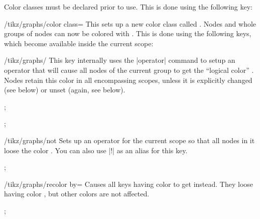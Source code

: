 Color classes must be declared prior to use. This is done using the following
key:
%
\begin{key}{/tikz/graphs/color class=}
    This sets up a new color class called . Nodes and
    whole groups of nodes can now be colored with . This
    is done using the following keys, which become
    available inside the current scope:
    \begin{key}{/tikz/graphs/}
        This key internally uses the |operator| command to setup an operator
        that will cause all nodes of the current group to get the ``logical
        color'' . Nodes retain this color in all
        encompassing scopes, unless it is explicitly changed (see below) or
        unset (again, see below).
\begin{codeexample}[preamble={\usetikzlibrary{graphs}}]
\tikz {};
\end{codeexample}
\begin{codeexample}[preamble={\usetikzlibrary{graphs}}]
\tikz {};
\end{codeexample}
    \end{key}
    \begin{key}{/tikz/graphs/not }
        Sets up an operator for the current scope so that all nodes in it loose
        the color . You can also use |!| as an alias for this key.
\begin{codeexample}[preamble={\usetikzlibrary{graphs}}]
\tikz {};
\end{codeexample}
    \end{key}
    \begin{key}{/tikz/graphs/recolor  by=}
        Causes all keys having color  to get  instead. They loose having color , but
        other colors are not affected.
\begin{codeexample}[preamble={\usetikzlibrary{graphs}}]
\tikz {};
\end{codeexample}
    \end{key}
\end{key}

